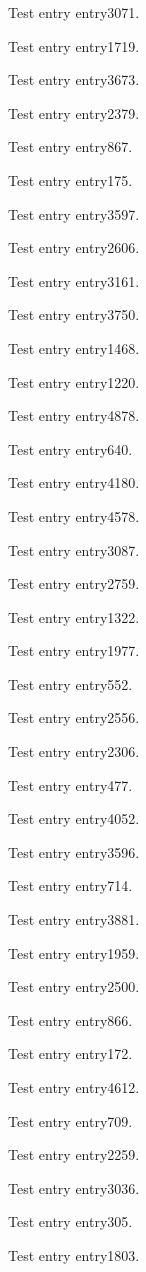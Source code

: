 Test entry \gls{entry3071}.

Test entry \gls{entry1719}.

Test entry \gls{entry3673}.

Test entry \gls{entry2379}.

Test entry \gls{entry867}.

Test entry \gls{entry175}.

Test entry \gls{entry3597}.

Test entry \gls{entry2606}.

Test entry \gls{entry3161}.

Test entry \gls{entry3750}.

Test entry \gls{entry1468}.

Test entry \gls{entry1220}.

Test entry \gls{entry4878}.

Test entry \gls{entry640}.

Test entry \gls{entry4180}.

Test entry \gls{entry4578}.

Test entry \gls{entry3087}.

Test entry \gls{entry2759}.

Test entry \gls{entry1322}.

Test entry \gls{entry1977}.

Test entry \gls{entry552}.

Test entry \gls{entry2556}.

Test entry \gls{entry2306}.

Test entry \gls{entry477}.

Test entry \gls{entry4052}.

Test entry \gls{entry3596}.

Test entry \gls{entry714}.

Test entry \gls{entry3881}.

Test entry \gls{entry1959}.

Test entry \gls{entry2500}.

Test entry \gls{entry866}.

Test entry \gls{entry172}.

Test entry \gls{entry4612}.

Test entry \gls{entry709}.

Test entry \gls{entry2259}.

Test entry \gls{entry3036}.

Test entry \gls{entry305}.

Test entry \gls{entry1803}.

